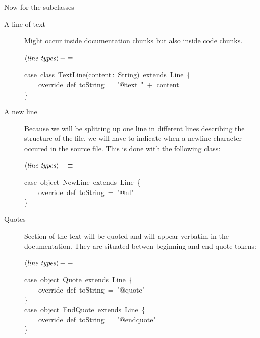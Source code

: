 \documentclass[a4paper,12pt]{article}
\begin{document}
Now for the subclasses

\begin{description}
\item[A line of text] Might occur inside documentation chunks but also
inside code chunks.

$\left<\mbox{\emph{line types}}\right>+\equiv$
\begin{program}{\vem case}~{\vem class}~TextLine$($content\,{\rm :}~String$)$~{\vem extends}~Line~{\small\{}
\\~~~~{\vem override}~{\vem def}~toString~=~"@text~"~$+$~content
\\{\small\}}
\\[0.5em]\end{program}



\item[A new line] Because we will be splitting up one line in different lines
describing the structure of the file, we will have to indicate when a newline
character occured in the source file. This is done with the following class:

$\left<\mbox{\emph{line types}}\right>+\equiv$
\begin{program}{\vem case}~{\vem object}~NewLine~{\vem extends}~Line~{\small\{}
\\~~~~{\vem override}~{\vem def}~toString~=~"@nl"
\\{\small\}}
\\[0.5em]\end{program}



\item[Quotes] Section of the text will be quoted and will appear verbatim
in the documentation. They are situated betwen beginning and end quote tokens:

$\left<\mbox{\emph{line types}}\right>+\equiv$
\begin{program}{\vem case}~{\vem object}~Quote~{\vem extends}~Line~{\small\{}
\\~~~~{\vem override}~{\vem def}~toString~=~"@quote"
\\{\small\}}
\\{\vem case}~{\vem object}~EndQuote~{\vem extends}~Line~{\small\{}
\\~~~~{\vem override}~{\vem def}~toString~=~"@endquote"
\\{\small\}}
\\[0.5em]\end{program}




\end{description}
\end{document}
